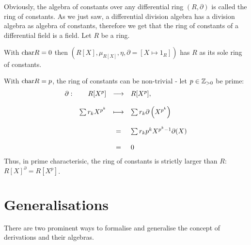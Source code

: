 \en
\bmk Obviously, the algebra of constants over any differential ring $(R, \partial)$ is called the ring of constants. As we just saw, a differential division algebra has a division algebra as algebra of constants, therefore we get that the ring of constants of a differential field is a field.
\bsp Let $R$ be a ring.
\bn
\item With $\chr R = 0$ then $\left(R[X],\mu_{R[X]}, \eta, \partial = \left[X \longmapsto 1_R\right]\right)$ has $R$ as its sole ring of constants.
\item With $\chr R = p$, the ring of constants can be non-trivial - let $p \in \zz_{>0}$ be prime:
$$
\bao{rrcl}
\partial : &R[X^p] &\longrightarrow& R[X^p],\\
&&&\\
&\sum r_k X^{p^k}& \longmapsto& \sum r_k \partial\left(X^{p^k}\right)\\
&&&\\
&& = & \sum r_k p^k X^{p^k-1}\partial(X)\\
&&&\\
&&=& 0\\
\ea$$
Thus, in prime characterisic, the ring of constants is strictly larger than $R$: $R[X]^\partial = R[X^p]$.
\en

\section{Generalisations}
There are two prominent ways to formalise and generalise the concept of derivations and their algebras.
